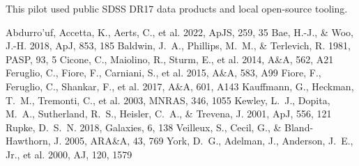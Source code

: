 \documentclass[twocolumn]{aastex631}
\begin{document}
\acknowledgments
This pilot used public SDSS DR17 data products and local open-source tooling.

\begin{thebibliography}{}
 Abdurro'uf, Accetta, K., Aerts, C., et al. 2022, ApJS, 259, 35
 Bae, H.-J., \& Woo, J.-H. 2018, ApJ, 853, 185
 Baldwin, J.~A., Phillips, M.~M., \& Terlevich, R. 1981, PASP, 93, 5
 Cicone, C., Maiolino, R., Sturm, E., et al. 2014, A\&A, 562, A21
 Feruglio, C., Fiore, F., Carniani, S., et al. 2015, A\&A, 583, A99
 Fiore, F., Feruglio, C., Shankar, F., et al. 2017, A\&A, 601, A143
 Kauffmann, G., Heckman, T.~M., Tremonti, C., et al. 2003, MNRAS, 346, 1055
 Kewley, L.~J., Dopita, M.~A., Sutherland, R.~S., Heisler, C.~A., \& Trevena, J. 2001, ApJ, 556, 121
 Rupke, D.~S.~N. 2018, Galaxies, 6, 138
 Veilleux, S., Cecil, G., \& Bland-Hawthorn, J. 2005, ARA\&A, 43, 769
 York, D.~G., Adelman, J., Anderson, J.~E., Jr., et al. 2000, AJ, 120, 1579
\end{thebibliography}
\end{document}

